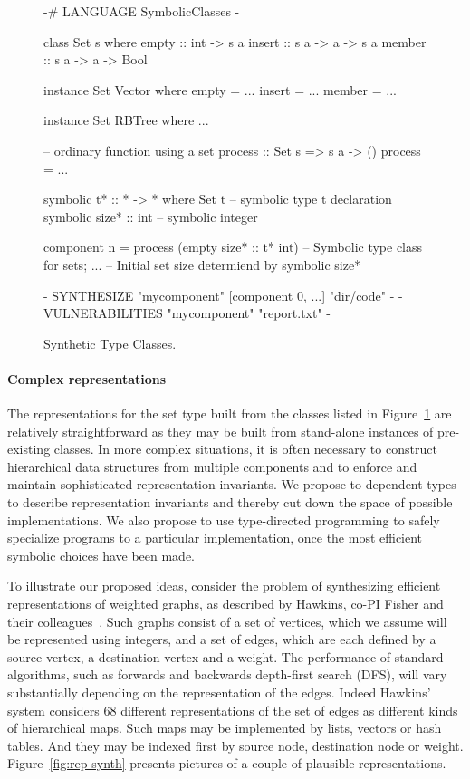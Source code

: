 \begin{figure}[t]
\centering
\begin{mylisting}
{-# LANGUAGE SymbolicClasses -}    

class Set s where
  empty :: int -> s a
  insert :: s a -> a -> s a
  member :: s a -> a -> Bool

instance Set Vector where
  empty = ...
  insert = ...
  member = ...

instance Set RBTree where
  ...

-- ordinary function using a set
process :: Set s => s a -> ()
process = ...

symbolic t* :: * -> * where Set t   -- symbolic type t declaration
symbolic size* :: int               -- symbolic integer

component n =
  process (empty size* :: t* int)   -- Symbolic type class for sets; 
  ...                                 -- Initial set size determiend by symbolic size*

{- SYNTHESIZE "mycomponent" [component 0, ...]  "dir/code" -} 
{- VULNERABILITIES "mycomponent" "report.txt" -} 

\end{mylisting}
\caption{Synthetic Type Classes.}
\label{fig:type-class-set}
\end{figure}

\paragraph*{Complex representations}

The representations for the set type built from the classes listed in
Figure~\ref{fig:type-class-set} are relatively straightforward as they
may be built from stand-alone instances of pre-existing classes.  In
more complex situations, it is often necessary to construct
hierarchical data structures from multiple components and to enforce
and maintain sophisticated representation invariants.  We propose
to dependent types to describe representation invariants and thereby
cut down the space of possible implementations.  We also propose to use
type-directed programming to safely specialize programs to a particular 
implementation, once the most efficient symbolic choices have been made.

To illustrate our proposed ideas, consider the problem of synthesizing
efficient representations of weighted graphs, as described by Hawkins,
co-PI Fisher and their colleagues~\cite{data-rep-synth}.  Such graphs
consist of a set of vertices, which we assume will be represented
using integers, and a set of edges, which are each defined by a source
vertex, a destination vertex and a weight.  The performance of
standard algorithms, such as forwards and backwards depth-first search
(DFS), will vary substantially depending on the representation of the
edges.  Indeed Hawkins' system considers 68 different representations
of the set of edges as different kinds of hierarchical maps.  Such
maps may be implemented by lists, vectors or hash tables.  And they
may be indexed first by source node, destination node or weight.
Figure~\ref{fig:rep-synth} presents pictures of a couple of plausible
representations.

